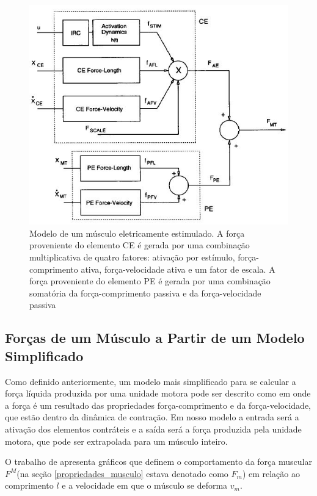 \begin{figure}[H]
\centering
\includegraphics[width = 1\textwidth]{img/Durfee1994_Modelo.JPG}
\caption[Exemplo de Modelo Simplificado para Obter as Forças dos Músculos]{Modelo de um músculo eletricamente estimulado. A força proveniente do elemento CE é gerada por uma combinação multiplicativa de quatro fatores: ativação por estímulo, força-comprimento ativa, força-velocidade ativa e um fator de escala. A força proveniente do elemento PE é gerada por uma combinação somatória da força-comprimento passiva e da força-velocidade passiva 
\cite{durfee1994estimation}}
\label{modelo_durfee}
\end{figure}


\subsection{Forças de um Músculo a Partir de um Modelo Simplificado}
\label{forcas_modelo_simplificado}
Como definido anteriormente, um modelo mais simplificado para se calcular a força líquida produzida por uma unidade motora pode ser descrito como em \cite{zajac1989muscle} onde a força é um resultado das propriedades força-comprimento e da força-velocidade, que estão dentro da dinâmica de contração. Em nosso modelo a entrada será a ativação dos elementos contráteis e a saída será a força produzida pela unidade motora, que pode ser extrapolada para um músculo inteiro.

O trabalho de \cite{zajac1989muscle} apresenta gráficos que definem o comportamento da força muscular $F^M$(na seção \ref{propriedades_musculo} estava denotado como $F_m$) em relação ao comprimento $l$ e a velocidade em que o músculo se deforma $v_m$. 


